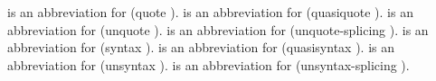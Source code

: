 \begin{entry}{%
}

\singlequote{} is an abbreviation
for {\cf (quote )}.
\backquote{} is an abbreviation
for {\cf (quasiquote )}.
\mainschindex{,}{\cf,} is an abbreviation
for {\cf (unquote )}.
\atsign{} is an abbreviation
for {\cf (unquote-splicing )}.
 is an abbreviation
for {\cf (syntax )}.
 is an abbreviation
for {\cf (quasisyntax )}.
\sharpindex{,}{\cf\#,} is an abbreviation
for {\cf (unsyntax )}.
 is an abbreviation
for {\cf (unsyntax-splicing )}.
\end{entry}

